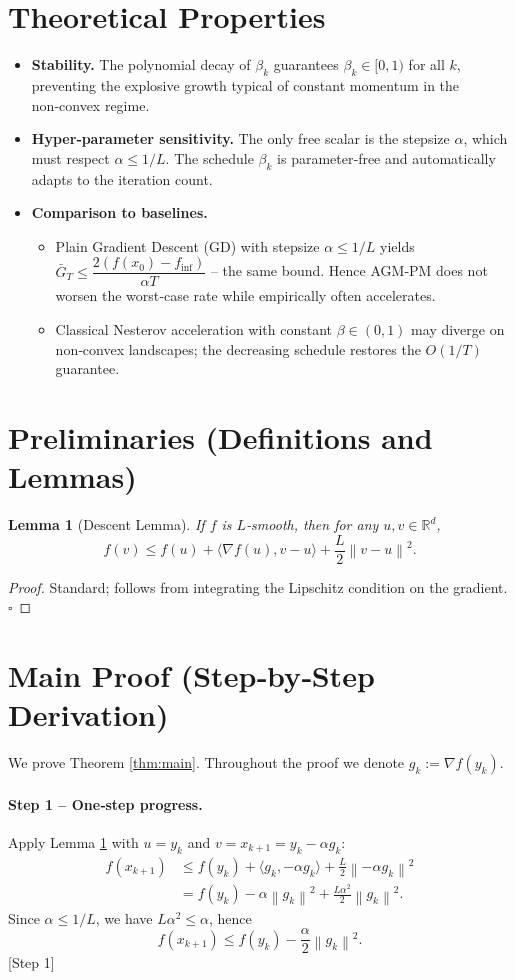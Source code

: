 \documentclass{article}
\newtheorem{lemma}{Lemma}
\newcommand{\norm}[1]{\left\lVert#1\right\rVert}
\newcommand{\grad}{\nabla}
\begin{document}
\section*{Theoretical Properties}
\begin{itemize}
\item \textbf{Stability.} The polynomial decay of $\beta_k$ guarantees $\beta_k\in[0,1)$ for all $k$, preventing the explosive growth typical of constant momentum in the non‑convex regime.
\item \textbf{Hyper‑parameter sensitivity.} The only free scalar is the stepsize $\alpha$, which must respect $\alpha\le 1/L$. The schedule $\beta_k$ is parameter‑free and automatically adapts to the iteration count.
\item \textbf{Comparison to baselines.}
\begin{itemize}
\item Plain Gradient Descent (GD) with stepsize $\alpha\le 1/L$ yields $\bar G_T\le \dfrac{2(f(x_0)-f_{\inf})}{\alpha T}$ – the same bound. Hence AGM‑PM does not worsen the worst‑case rate while empirically often accelerates.
\item Classical Nesterov acceleration with constant $\beta\in(0,1)$ may diverge on non‑convex landscapes; the decreasing schedule restores the $O(1/T)$ guarantee.
\end{itemize}
\end{itemize}

\section*{Preliminaries (Definitions and Lemmas)}
\begin{lemma}[Descent Lemma]\label{lem:descent}
If $f$ is $L$‑smooth, then for any $u,v\in\mathbb{R}^{d}$,
\[
f(v)\le f(u)+\langle\grad f(u),v-u\rangle+\frac{L}{2}\norm{v-u}^{2}.
\]
\end{lemma}
\begin{proof}
Standard; follows from integrating the Lipschitz condition on the gradient. \hfill $\square$
\end{proof}

\section*{Main Proof (Step‑by‑Step Derivation)}
We prove Theorem \ref{thm:main}. Throughout the proof we denote $g_k:=\grad f(y_k)$.

\paragraph{Step 1 – One‑step progress.}  
Apply Lemma \ref{lem:descent} with $u=y_k$ and $v=x_{k+1}=y_k-\alpha g_k$:
\[
\begin{aligned}
f(x_{k+1})
&\le f(y_k)+\langle g_k, -\alpha g_k\rangle
   +\frac{L}{2}\norm{-\alpha g_k}^{2}\\
&= f(y_k)-\alpha\norm{g_k}^{2}
   +\frac{L\alpha^{2}}{2}\norm{g_k}^{2}.
\end{aligned}
\]
Since $\alpha\le 1/L$, we have $L\alpha^{2}\le \alpha$, hence
\[
f(x_{k+1})\le f(y_k)-\frac{\alpha}{2}\norm{g_k}^{2}.
\tag{1}
\label{eq:one-step}
\] 
[Step 1]
\end{document}
